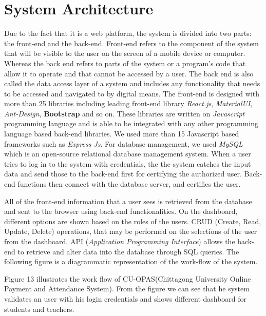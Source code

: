 \section{System Architecture}\label{sec:sa}
Due to the fact that it is a web platform, the system is divided into two parts: the front-end and the back-end. Front-end refers to the component of the system that will be visible to the user on the screen of a mobile device or computer. Whereas the back end refers to parts of the system or a program's code that allow it to operate and that cannot be accessed by a user. The back end is also called the data access layer of a system and includes any functionality that needs to be accessed and navigated to by digital means. The front-end is designed with more than 25 libraries including leading front-end library \textit{React.js}, \textit{MaterialUI}, \textit{Ant-Design}, \textbf{Bootstrap} and so on. These libraries are written on \textit{Javascript} programming language and is able to be integrated with any other programming language based back-end libraries. We used more than 15 Javascript based frameworks such as \textit{Express Js}. For database management, we used \textit{MySQL}\cite{mysql} which is an open-source relational database management system. When a user tries to log in to the system with credentials, the the system catches the input data and send those to the back-end first for certifying the authorized user. Back-end functions then connect with the database server, and certifies the user.

All of the front-end information that a user sees is retrieved from the database and sent to the browser using back-end functionalities. On the dashboard, different options are shown based on the roles of the users. CRUD (Create, Read, Update, Delete) operations, that may be performed on the selections of the user from the dashboard. API\cite{api} (\textit{Application Programming Interface}) allows the back-end to retrieve and alter data into the database through SQL queries. The following figure is a diagrammatic representation of the work-flow of the system.

Figure 13 illustrates the work flow of CU-OPAS(Chittagong University Online Payment and Attendance System). From the figure we can see that he system validates an user with his login credentials and shows different dashboard for students and teachers.

